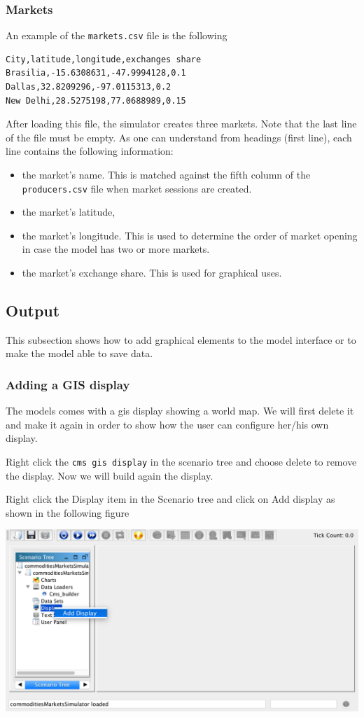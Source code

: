 \documentclass{article}
\begin{document}
\subsubsection{Markets}
An example of the \verb+markets.csv+ file is the following 

\begin{verbatim}
City,latitude,longitude,exchanges share
Brasilia,-15.6308631,-47.9994128,0.1
Dallas,32.8209296,-97.0115313,0.2
New Delhi,28.5275198,77.0688989,0.15

\end{verbatim}

After loading this file, the simulator creates three markets. Note that the last line of the file must be empty.
As one can understand from headings (first line), each line contains the following information:
\begin{itemize}
	\item the market's name. This is matched against the fifth column of the \verb+producers.csv+ file when market sessions are created.
	\item the market's latitude,
	\item the market's longitude. This is used to determine the order of market opening in case the model has two or more markets.
	\item the market's exchange share. This is used for graphical uses.
\end{itemize}


\subsection{Output}
This subsection shows how to add graphical elements to the model interface or to make the model able to save data.

\subsubsection{Adding a GIS display}
The models comes with a gis display showing a world map. We will first delete it and make it again in order to show how the user can configure her/his own display.

Right click the \verb+cms gis display+ in the scenario tree and choose delete to remove the display. Now we will build again the display. 

Right click the Display item in the Scenario tree and click on Add display as shown in the following figure

\vskip2mm
\includegraphics[scale=0.35]{fig_cms_rs_gis1}
\end{document}
